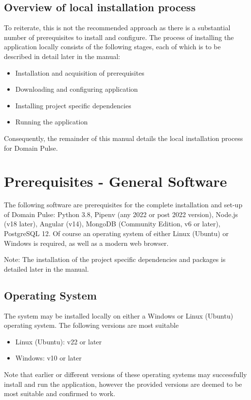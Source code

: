 \documentclass[12pt]{article}
\begin{document}
\subsection{Overview of local installation process}
To reiterate, this is not the recommended approach as there is a substantial number of prerequisites to install and configure.
The process of installing the application locally consists of the following stages, each of which is to be described in detail
later in the manual:
\begin{itemize}
    \item Installation and acquisition of prerequisites
    \item Downloading and configuring application
    \item Installing project specific dependencies
    \item Running the application
\end{itemize}
Consequently, the remainder of this manual details the local installation process for Domain Pulse.

\section{Prerequisites - General Software}
The following software are prerequisites for the complete installation and set-up of Domain Pulse: Python 3.8, Pipenv (any 2022 or post 2022 version), Node.js (v18 later), Angular (v14), MongoDB (Community Edition, v6 or later), PostgreSQL 12.
Of course an operating system of either Linux (Ubuntu) or Windows is required, as well as a modern web browser.

Note: The installation of the project specific dependencies and packages is detailed later in the manual.

\subsection{Operating System}
The system may be installed locally on either a Windows or Linux (Ubuntu) operating system. The following versions are most suitable
\begin{itemize}
    \item Linux (Ubuntu): v22 or later
    \item Windows: v10 or later
\end{itemize}
Note that earlier or different versions of these operating systems may successfully install and run the application, however the provided
versions are deemed to be most suitable and confirmed to work.
\end{document}
